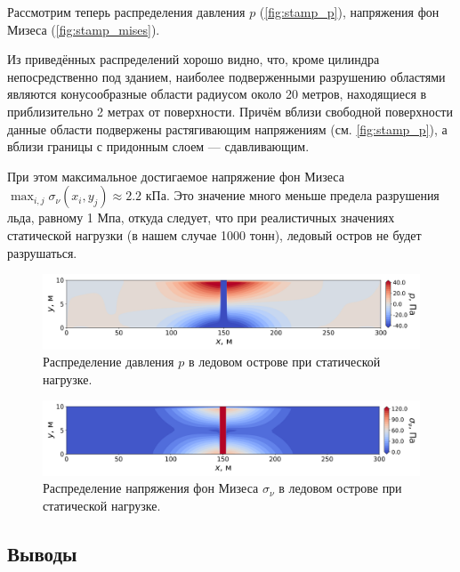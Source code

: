 Рассмотрим теперь распределения давления $p$ (\autoref{fig:stamp_p}), напряжения фон Мизеса (\autoref{fig:stamp_mises}).

Из приведённых распределений хорошо видно, что, кроме цилиндра непосредственно под зданием, наиболее подверженными разрушению областями являются конусообразные области радиусом около 20 метров, находящиеся в приблизительно 2 метрах от поверхности. Причём вблизи свободной поверхности данные области подвержены растягивающим напряжениям (см. \autoref{fig:stamp_p}), а вблизи границы с придонным слоем --- сдавливающим.

При этом максимальное достигаемое напряжение фон Мизеса $\max_{i,j} \sigma_\nu\left(x_i, y_j\right) \approx 2.2$ кПа. Это значение много меньше предела разрушения льда, равному 1 Мпа, откуда следует, что при реалистичных значениях статической нагрузки (в нашем случае 1000 тонн), ледовый остров не будет разрушаться.

\begin{figure}[htb]
    \centering
    \includegraphics[width=\textwidth]{images/stamp/stamp_p.png}
    \caption{Распределение давления $p$ в ледовом острове при статической нагрузке.}
    \label{fig:stamp_p}
\end{figure}

\begin{figure}[htb]
    \centering
    \includegraphics[width=\textwidth]{images/stamp/stamp_mises.png}
    \caption{Распределение напряжения фон Мизеса $\sigma_\nu$ в ледовом острове при статической нагрузке.}
    \label{fig:stamp_mises}
\end{figure}

\subsection{Выводы}